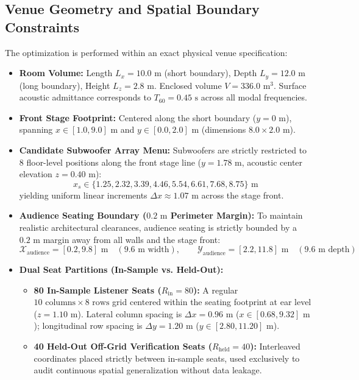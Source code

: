 \documentclass[11pt,a4paper,titlepage]{article}
\begin{document}
\subsection{Venue Geometry and Spatial Boundary Constraints}
The optimization is performed within an exact physical venue specification:
\begin{itemize}
    \item \textbf{Room Volume:} Length $L_x = 10.0\text{ m}$ (short boundary), Depth $L_y = 12.0\text{ m}$ (long boundary), Height $L_z = 2.8\text{ m}$. Enclosed volume $V = 336.0\text{ m}^3$. Surface acoustic admittance corresponds to $T_{60} = 0.45\text{ s}$ across all modal frequencies.
    \item \textbf{Front Stage Footprint:} Centered along the short boundary ($y = 0\text{ m}$), spanning $x \in [1.0, 9.0]\text{ m}$ and $y \in [0.0, 2.0]\text{ m}$ (dimensions $8.0 \times 2.0\text{ m}$).
    \item \textbf{Candidate Subwoofer Array Menu:} Subwoofers are strictly restricted to 8 floor-level positions along the front stage line ($y = 1.78\text{ m}$, acoustic center elevation $z = 0.40\text{ m}$):
    \begin{equation}
        x_s \in \{1.25, 2.32, 3.39, 4.46, 5.54, 6.61, 7.68, 8.75\}\text{ m}
    \end{equation}
    yielding uniform linear increments $\Delta x \approx 1.07\text{ m}$ across the stage front.
    \item \textbf{Audience Seating Boundary ($0.2\text{ m}$ Perimeter Margin):} To maintain realistic architectural clearances, audience seating is strictly bounded by a $0.2\text{ m}$ margin away from all walls and the stage front:
    \begin{equation}
        \mathcal{X}_{\text{audience}} = [0.2, 9.8]\text{ m} \quad (9.6\text{ m width}), \qquad \mathcal{Y}_{\text{audience}} = [2.2, 11.8]\text{ m} \quad (9.6\text{ m depth})
    \end{equation}
    \item \textbf{Dual Seat Partitions (In-Sample vs. Held-Out):}
    \begin{itemize}
        \item \textbf{80 In-Sample Listener Seats ($R_{\text{in}} = 80$):} A regular $10\text{ columns} \times 8\text{ rows}$ grid centered within the seating footprint at ear level ($z = 1.10\text{ m}$). Lateral column spacing is $\Delta x = 0.96\text{ m}$ ($x \in [0.68, 9.32]\text{ m}$); longitudinal row spacing is $\Delta y = 1.20\text{ m}$ ($y \in [2.80, 11.20]\text{ m}$).
        \item \textbf{40 Held-Out Off-Grid Verification Seats ($R_{\text{held}} = 40$):} Interleaved coordinates placed strictly between in-sample seats, used exclusively to audit continuous spatial generalization without data leakage.
    \end{itemize}
\end{itemize}
\end{document}
